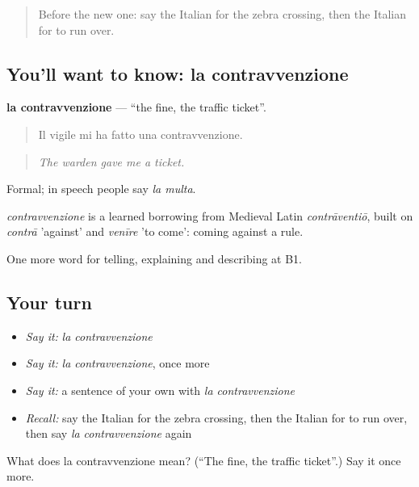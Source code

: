 \label{lesson:IT-C412-contravvenzione}



\begin{quote}
Before the new one: say the Italian for the zebra crossing, then the Italian for to run over.
\end{quote}

\subsection*{You'll want to know: la contravvenzione}
\textbf{la contravvenzione} — \textquotedblleft{}the fine, the traffic ticket\textquotedblright{}.

\begin{quote}
Il vigile mi ha fatto una contravvenzione.
\end{quote}

\begin{quote}
\emph{The warden gave me a ticket.}
\end{quote}

Formal; in speech people say \emph{la multa}.

\begin{cousinweb}
\emph{contravvenzione} is a learned borrowing from Medieval Latin \emph{contrāventiō}, built on \emph{contrā} 'against' and \emph{venīre} 'to come': coming against a rule.
\end{cousinweb}

\begin{grammarlens}[title={What you've built}]
One more word for telling, explaining and describing at B1.
\end{grammarlens}

\subsection*{Your turn}
\begin{itemize}
\raggedright
  \item \emph{Say it:} \emph{la contravvenzione}
  \item \emph{Say it:} \emph{la contravvenzione}, once more
  \item \emph{Say it:} a sentence of your own with \emph{la contravvenzione}
  \item \emph{Recall:} say the Italian for the zebra crossing, then the Italian for to run over, then say \emph{la contravvenzione} again
\end{itemize}

\begin{tcolorbox}[breakable,colback=teal!4,colframe=teal!35!black,title={Before you move on}]
What does la contravvenzione mean? (\textquotedblleft{}The fine, the traffic ticket\textquotedblright{}.) Say it once more.
\end{tcolorbox}
